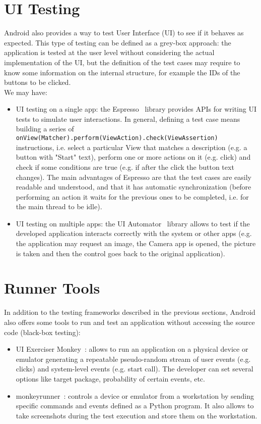 \documentclass[11pt,a4paper,notitlepage]{article}
\begin{document}
\section{UI Testing}
Android also provides a way to test User Interface (UI) to see if it behaves as expected. This type of testing can be defined as a grey-box approach: the application is tested at the user level without considering the actual implementation of the UI, but the definition of the test cases may require to know some information on the internal structure, for example the IDs of the buttons to be clicked.\medskip \\
We may have:
\begin{itemize}
	\item UI testing on a single app: the Espresso~\cite{Espresso} library provides APIs for writing UI tests to simulate user interactions. In general, defining a test case means building a series of \texttt{onView(Matcher).perform(ViewAction).check(ViewAssertion)} instructions, i.e. select a particular View that matches a description (e.g. a button with "Start" text), perform one or more actions on it (e.g. click) and check if some conditions are true (e.g. if after the click the button text changes). The main advantages of Espresso are that the test cases are easily readable and understood, and that it has automatic synchronization (before performing an action it waits for the previous ones to be completed, i.e. for the main thread to be idle).
	\item UI testing on multiple apps: the UI Automator~\cite{UIAutomator} library allows to test if the developed application interacts correctly with the system or other apps (e.g. the application may request an image, the Camera app is opened, the picture is taken and then the control goes back to the original application). 
\end{itemize}

\section{Runner Tools}
In addition to the testing frameworks described in the previous sections, Android also offers some tools to run and test an application without accessing the source code (black-box testing):
\begin{itemize}
	\item UI Exerciser Monkey~\cite{UIExerciserMonkey}: allows to run an application on a physical device or emulator generating a repeatable pseudo-random stream of user events (e.g. clicks) and system-level events (e.g. start call). The developer can set several options like target package, probability of certain events, etc.
	\item monkeyrunner~\cite{monkeyrunner}: controls a device or emulator from a workstation by sending specific commands and events defined as a Python program. It also allows to take screenshots during the test execution and store them on the workstation.
\end{itemize}
\end{document}
